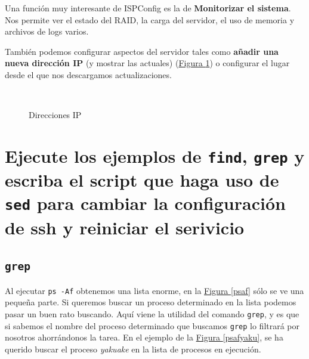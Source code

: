 \documentclass[10pt,a4paper,spanish]{article}
\numberwithin{equation}{section} %
\numberwithin{figure}{section} %
\numberwithin{table}{section} %
\begin{document}
Una función muy interesante de ISPConfig es la de \textbf{Monitorizar el sistema}. Nos permite ver el estado del RAID, la carga del servidor, el uso de memoria y archivos de logs varios.

También podemos configurar aspectos del servidor tales como \textbf{añadir una nueva dirección IP} (y mostrar las actuales) (\hyperref[ipdir]{Figura \ref*{ipdir}}) o configurar el lugar desde el que nos descargamos actualizaciones.

\begin{figure}[!h]
\centering
\mbox {
\qquad
{}
}
\caption{Direcciones IP}
\label{ipdir}
\end{figure}

\section{Ejecute los ejemplos de \texttt{find}, \texttt{grep} y escriba el script que haga uso de \texttt{sed} para cambiar la configuración de ssh y reiniciar el serivicio}
\subsection{\texttt{grep}}
Al ejecutar \texttt{ps -Af} obtenemos una lista enorme, en la \hyperref[psaf]{Figura \ref*{psaf}} sólo se ve una pequeña parte. Si queremos buscar un proceso determinado en la lista podemos pasar un buen rato buscando. Aquí viene la utilidad del comando \texttt{grep}, y es que si sabemos el nombre del proceso determinado que buscamos \texttt{grep} lo filtrará por nosotros ahorrándonos la tarea. En el ejemplo de la \hyperref[psafyaku]{Figura \ref*{psafyaku}}, se ha querido buscar el proceso \textit{yakuake} en la lista de procesos en ejecución.
\end{document}
